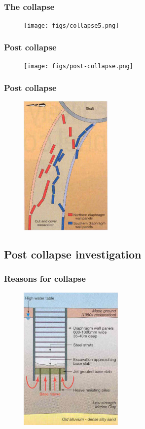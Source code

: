 \documentclass[notes]{beamer}
\begin{document}
\begin{frame}
\frametitle{The collapse}
\begin{figure}[ht]
	\centering
	\texttt{[image: figs/collapse5.png]}
\end{figure}
\end{frame}

\begin{frame}
\frametitle{Post collapse}
\begin{figure}[ht]
	\centering
	\texttt{[image: figs/post-collapse.png]}
\end{figure}
\end{frame}

\begin{frame}
\frametitle{Post collapse}
\begin{figure}[ht]
	\centering
	\includegraphics[width=0.4\textwidth]{figs/final-dwall-panels.png}
\end{figure}
\end{frame}

\subsection{Post collapse investigation}
\begin{frame}
\frametitle{Reasons for collapse}
\begin{figure}[ht]
	\centering
	\includegraphics[width=0.45\textwidth]{figs/reasons-collapse.png}
\end{figure}
\end{frame}
\end{document}
